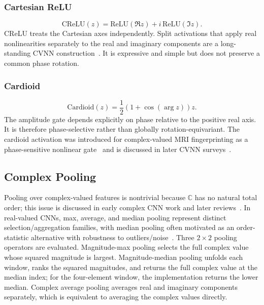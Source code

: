 \subsubsection{Cartesian ReLU}
\begin{equation}
\mathrm{CReLU}(z)=\mathrm{ReLU}(\Re z)+i\,\mathrm{ReLU}(\Im z).
\end{equation}
CReLU treats the Cartesian axes independently. Split activations that apply real nonlinearities separately to the real and imaginary components are a long-standing CVNN construction~\cite{Nitta1997ComplexBP,Scardapane2020ComplexActivations,Lee2022CVNNSurvey}. It is expressive and simple but does not preserve a common phase rotation.

\subsubsection{Cardioid}
\begin{equation}
\mathrm{Cardioid}(z)=\frac{1}{2}\left(1+\cos(\arg z)\right)z.
\end{equation}
The amplitude gate depends explicitly on phase relative to the positive real axis. It is therefore phase-selective rather than globally rotation-equivariant. The cardioid activation was introduced for complex-valued MRI fingerprinting as a phase-sensitive nonlinear gate~\cite{Virtue2017ComplexActivation} and is discussed in later CVNN surveys~\cite{Lee2022CVNNSurvey}.

\subsection{Complex Pooling}
Pooling over complex-valued features is nontrivial because $\mathbb{C}$ has no natural total order; this issue is discussed in early complex CNN work and later reviews~\cite{Guberman2016ComplexCNN,Lee2022CVNNSurvey}. In real-valued CNNs, max, average, and median pooling represent distinct selection/aggregation families, with median pooling often motivated as an order-statistic alternative with robustness to outliers/noise~\cite{Tao2022Pooling}. Three $2\times2$ pooling operators are evaluated. Magnitude-max pooling selects the full complex value whose squared magnitude is largest. Magnitude-median pooling unfolds each window, ranks the squared magnitudes, and returns the full complex value at the median index; for the four-element window, the implementation returns the lower median. Complex average pooling averages real and imaginary components separately, which is equivalent to averaging the complex values directly.

